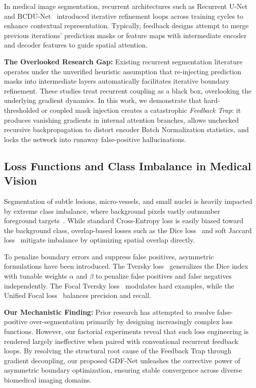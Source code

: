 In medical image segmentation, recurrent architectures such as Recurrent U-Net~\cite{alom2018recurrent} and BCDU-Net~\cite{azad2019bi} introduced iterative refinement loops across training cycles to enhance contextual representation. Typically, feedback designs attempt to merge previous iterations' prediction masks or feature maps with intermediate encoder and decoder features to guide spatial attention.

\textbf{The Overlooked Research Gap:}
Existing recurrent segmentation literature operates under the unverified heuristic assumption that re-injecting prediction masks into intermediate layers automatically facilitates iterative boundary refinement. These studies treat recurrent coupling as a black box, overlooking the underlying gradient dynamics. In this work, we demonstrate that hard-thresholded or coupled mask injection creates a catastrophic \textit{Feedback Trap}: it produces vanishing gradients in internal attention branches, allows unchecked recursive backpropagation to distort encoder Batch Normalization statistics, and locks the network into runaway false-positive hallucinations.

\subsection{Loss Functions and Class Imbalance in Medical Vision}
Segmentation of subtle lesions, micro-vessels, and small nuclei is heavily impacted by extreme class imbalance, where background pixels vastly outnumber foreground targets~\cite{salehi2017tversky}. While standard Cross-Entropy loss is easily biased toward the background class, overlap-based losses such as the Dice loss~\cite{milletari2016vnet} and soft Jaccard loss~\cite{rahman2016optimizing} mitigate imbalance by optimizing spatial overlap directly.

To penalize boundary errors and suppress false positives, asymmetric formulations have been introduced. The Tversky loss~\cite{salehi2017tversky} generalizes the Dice index with tunable weights $\alpha$ and $\beta$ to penalize false positives and false negatives independently. The Focal Tversky loss~\cite{abraham2019novel} modulates hard examples, while the Unified Focal loss~\cite{yeung2022unified} balances precision and recall. 

\textbf{Our Mechanistic Finding:}
Prior research has attempted to resolve false-positive over-segmentation primarily by designing increasingly complex loss functions. However, our factorial experiments reveal that such loss engineering is rendered largely ineffective when paired with conventional recurrent feedback loops. By resolving the structural root cause of the Feedback Trap through gradient decoupling, our proposed GDF-Net unleashes the corrective power of asymmetric boundary optimization, ensuring stable convergence across diverse biomedical imaging domains.

